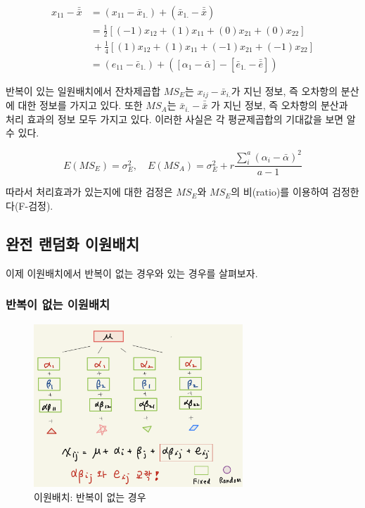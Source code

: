 \documentclass[
]{book}
\theoremstyle{definition}
\theoremstyle{definition}
\theoremstyle{definition}
\theoremstyle{remark}
\begin{document}
\begin{align*}
x_{11} - \bar { \bar x }  & = ( x_{11} - \bar x_{1.}) +  (  {\bar x}_{1.} - \bar { \bar x }) \\
  & = \frac{1}{2} \left [ (-1)x_{12} +(1) x_{11} + (0)x_{21} + (0) x_{22} \right ] \\
   &~ + \frac{1}{4}  \left [ (1)x_{12} +(1) x_{11} + (-1)x_{21} + (-1) x_{22} \right ]  \\ 
  & =  ( e_{11} -  {\bar e}_{1.} ) +  ( [\alpha_1 - \bar \alpha] - [ {\bar e}_{1.} - \bar {\bar e} ])
\end{align*}

반복이 있는 일원배치에서 잔차제곱합 \(MS_E\)는 \(x_{ij} - \bar x_{i.}\)가 지닌 정보, 즉 오차항의 분산에 대한 정보를 가지고 있다.
또한 \(MS_A\)는 \(\bar x_{i.}- \bar { \bar x }\) 가 지닌 정보, 즉 오차항의 분산과 처리 효과의 정보 모두 가지고 있다. 이러한 사실은 각 평균제곱합의 기대값을 보면 알 수 있다.

\[
E (MS_E) = \sigma_E^2,  \quad E(MS_A) = \sigma^2_E + r \frac {\sum_i^a (\alpha_i - \bar \alpha)^2}{a-1}  
\]

따라서 처리효과가 있는지에 대한 검정은 \(MS_E\)와 \(MS_E\)의 비(ratio)를 이용하여 검정한다(F-검정).

\hypertarget{uxc644uxc804-uxb79cuxb364uxd654-uxc774uxc6d0uxbc30uxce58}{%
\subsection{완전 랜덤화 이원배치}\label{uxc644uxc804-uxb79cuxb364uxd654-uxc774uxc6d0uxbc30uxce58}}

이제 이원배치에서 반복이 없는 경우와 있는 경우를 살펴보자.

\hypertarget{uxbc18uxbcf5uxc774-uxc5c6uxb294-uxc774uxc6d0uxbc30uxce58}{%
\subsubsection{반복이 없는 이원배치}\label{uxbc18uxbcf5uxc774-uxc5c6uxb294-uxc774uxc6d0uxbc30uxce58}}

\begin{figure}
\centering
\includegraphics[width=0.7\textwidth,height=\textheight]{confound2.png}
\caption{이원배치: 반복이 없는 경우}
\end{figure}
\end{document}
